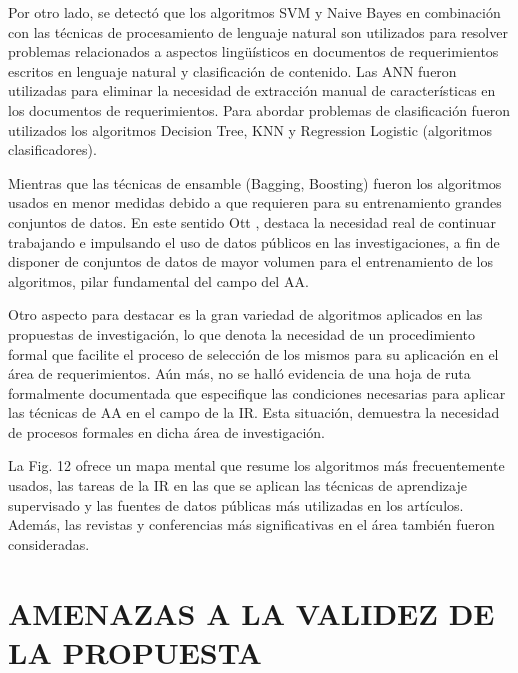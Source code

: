 \documentclass[journal]{IEEEtran}
\begin{document}
Por otro lado, se detectó que los algoritmos SVM y Naive Bayes en combinación con las técnicas de procesamiento de lenguaje natural son utilizados para resolver problemas relacionados a aspectos lingüísticos en documentos de requerimientos escritos en lenguaje natural y clasificación de contenido. Las ANN fueron utilizadas para eliminar la necesidad de extracción manual de características en los documentos de requerimientos. Para abordar problemas de clasificación fueron utilizados los algoritmos Decision Tree, KNN y Regression Logistic (algoritmos clasificadores).

Mientras que las técnicas de ensamble (Bagging, Boosting) fueron los algoritmos usados en menor medidas debido a que requieren para su entrenamiento grandes conjuntos de datos. En este sentido Ott \cite{Ott2013}, destaca la necesidad real de continuar trabajando e impulsando el uso de datos públicos en las investigaciones, a fin de disponer de conjuntos de datos de mayor volumen para el entrenamiento de los algoritmos, pilar fundamental del campo del AA. 

Otro aspecto para destacar es la gran variedad de algoritmos aplicados en las propuestas de investigación, lo que denota la necesidad de un procedimiento formal que facilite el proceso de selección de los mismos para su aplicación en el área de requerimientos.  Aún más, no se halló evidencia de una hoja de ruta formalmente documentada que especifique las condiciones necesarias para aplicar las técnicas de AA en el campo de la IR. Esta situación, demuestra la necesidad de procesos formales en dicha área de investigación.

La Fig. 12 ofrece un mapa mental que resume los algoritmos más frecuentemente usados, las tareas de la IR en las que se aplican las técnicas de aprendizaje supervisado y las fuentes de datos públicas más utilizadas en los artículos. Además, las revistas y conferencias más significativas en el área también fueron consideradas.

\section{AMENAZAS A LA VALIDEZ DE LA PROPUESTA}
\end{document}
